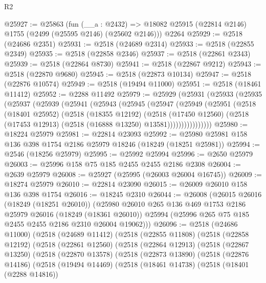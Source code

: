 \begin{lexlean}{R2}
\begin{coremodule}
@25927 := @25863
    (fun (__a : @2432) => @18082 @25915 (@22814 @2146) @1755 (@2499 (@25595 @2146) (@25602 @2146)))
    @2264
@25929 := @2518 (@24686 @2351)
@25931 := @2518 (@24689 @2314)
@25933 := @2518 (@22855 @2349)
@25935 := @2518 (@22858 @2346)
@25937 := @2518 (@22861 @2343)
@25939 := @2518 (@22864 @8730)
@25941 := @2518 (@22867 @9212)
@25943 := @2518 (@22870 @9680)
@25945 := @2518 (@22873 @10134)
@25947 := @2518 (@22876 @10574)
@25949 := @2518 (@19494 @11000)
@25951 := @2518 (@18461 @11412)
@25952 := @2288 @11492
@25979 := @25929
    (@25931
      (@25933
        (@25935
          (@25937
            (@25939
              (@25941
                (@25943
                  (@25945
                    (@25947
                      (@25949
                        (@25951
                          (@2518
                            (@18401 @25952)
                            (@2518
                              (@18355 @12192)
                              (@2518
                                (@17450 @12560)
                                (@2518 (@17453 @12913) (@2518 (@16888 @13250) @13581))))))))))))))))
@25980 := @18224 @25979
@25981 := @22814 @23093
@25992 := @25980 @25981 @158 @136 @398 @1754 @2186 @25979 @18246 (@18249 (@18251 @25981))
@25994 := @2546 (@18256 @25979)
@25995 := @25992 @25994
@25996 := @2650 @25979
@26003 := @25996 @158 @75 @185 @2455 @2455 @2186 @2308
@26004 := @2639 @25979
@26008 := @25927 (@25995 (@26003 @26004 @16745))
@26009 := @18274 @25979
@26010 := @22814 @23090
@26015 := @26009 @26010 @158 @136 @398 @1754
@26016 := @18245 @2310
@26044 := @26008
    (@26015
      @26016
      (@18249 (@18251 @26010))
      (@25980
        @26010
        @265
        @136
        @469
        @1753
        @2186
        @25979
        @26016
        (@18249 (@18361 @26010))
        @25994
        (@25996 @265 @75 @185 @2455 @2455 @2186 @2310 @26004 @19062)))
@26096 := @2518
    (@24686 @11000)
    (@2518
      (@24689 @11412)
      (@2518
        (@22855 @11808)
        (@2518
          (@22858 @12192)
          (@2518
            (@22861 @12560)
            (@2518
              (@22864 @12913)
              (@2518
                (@22867 @13250)
                (@2518
                  (@22870 @13578)
                  (@2518
                    (@22873 @13890)
                    (@2518
                      (@22876 @14186)
                      (@2518
                        (@19494 @14469)
                        (@2518
                          (@18461 @14738)
                          (@2518
                            (@18401 (@2288 @14816))

\end{coremodule}
\end{lexlean}
